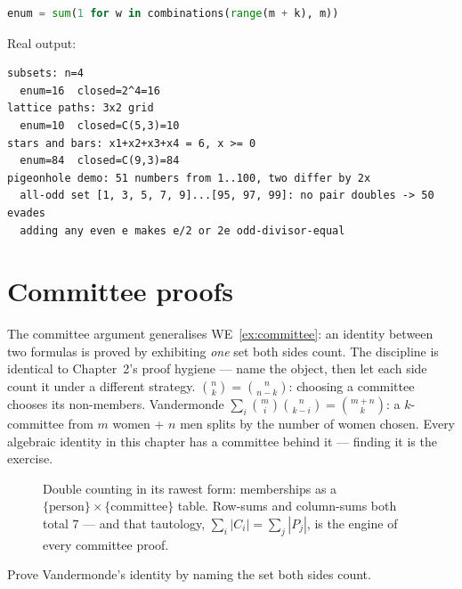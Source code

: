 \begin{lstlisting}[language=Python,caption={\texttt{count\_check.py}:
enumeration vs closed forms (full script in
\texttt{code/count\_check.py}).},label={lst:count}]
enum = sum(1 for w in combinations(range(m + k), m))
\end{lstlisting}
Real output:
\begin{lstlisting}[numbers=none]
subsets: n=4
  enum=16  closed=2^4=16
lattice paths: 3x2 grid
  enum=10  closed=C(5,3)=10
stars and bars: x1+x2+x3+x4 = 6, x >= 0
  enum=84  closed=C(9,3)=84
pigeonhole demo: 51 numbers from 1..100, two differ by 2x
  all-odd set [1, 3, 5, 7, 9]...[95, 97, 99]: no pair doubles -> 50 evades
  adding any even e makes e/2 or 2e odd-divisor-equal
\end{lstlisting}

\section{Committee proofs}\label{sec:committee}

The committee argument generalises WE~\ref{ex:committee}: an identity
between two formulas is proved by exhibiting \emph{one} set both sides
count. The discipline is identical to Chapter~2's proof hygiene --- name
the object, then let each side count it under a different strategy.
$\binom{n}{k} = \binom{n}{n-k}$: choosing a committee chooses its
non-members. Vandermonde $\sum_i \binom{m}{i}\binom{n}{k-i} =
\binom{m+n}{k}$: a $k$-committee from $m$ women + $n$ men splits by the
number of women chosen. Every algebraic identity in this chapter has a
committee behind it --- finding it is the exercise.

\begin{figure}[ht]\centering

\caption{Double counting in its rawest form: memberships as a
$\{\text{person}\}\times\{\text{committee}\}$ table. Row-sums and
column-sums both total $7$ --- and that tautology,
$\sum_i |C_i| = \sum_j |P_j|$, is the engine of every committee proof.}
\label{fig:doublecount}
\end{figure}

\begin{exercise}[medium]\label{exr:vandermonde}
Prove Vandermonde's identity by naming the set both sides count.
\end{exercise}

